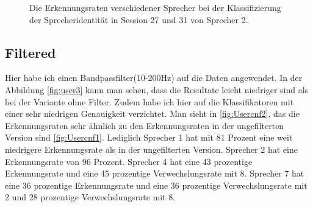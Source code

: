 \begin{figure}[H]
\centering     %
{}
\caption{Die Erkennungsraten verschiedener Sprecher bei der Klassifizierung der Sprecheridentität in Session 27 und 31 von Sprecher 2.}
\end{figure}

\subsection{Filtered}
Hier habe ich einen Bandpassfilter(10-200Hz) auf die Daten angewendet. In der Abbildung \ref{fig:user3} kann man sehen, dass die Resultate leicht niedriger sind als bei der Variante ohne Filter. Zudem habe ich hier auf die Klassifikatoren mit einer sehr niedrigen Genauigkeit verzichtet. Man sieht in \ref{fig:Usercnf2}, das die Erkennungsraten sehr ähnlich zu den Erkennungsraten in der ungefilterten Version sind \ref{fig:Usercnf1}. Lediglich Sprecher 1 hat mit 81 Prozent eine weit niedrigere Erkennungsrate als in der ungefilterten Version. Sprecher 2 hat eine Erkennungsrate von 96 Prozent. Sprecher 4 hat eine 43 prozentige Erkennungsrate und eine 45 prozentige Verwechslungsrate mit 8. Sprecher 7 hat eine 36 prozentige Erkennungsrate und eine 36 prozentige Verwechslungsrate mit 2 und 28 prozentige Verwechslungsrate mit 8.

